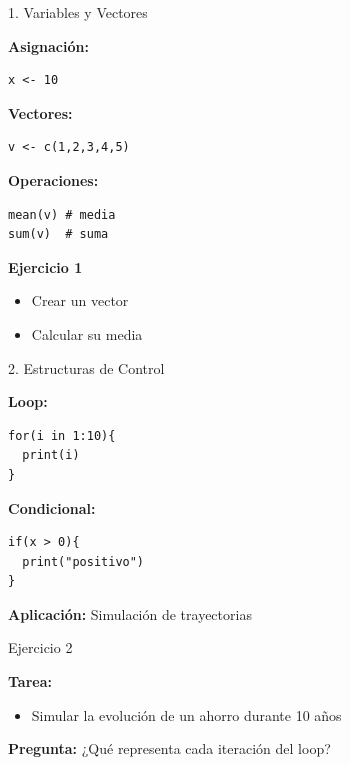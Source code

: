 \documentclass[10pt]{beamer}
\begin{document}
\begin{frame}[fragile]{1. Variables y Vectores}

\textbf{Asignación:}

\begin{verbatim}
x <- 10
\end{verbatim}

\vspace{0.3cm}

\textbf{Vectores:}

\begin{verbatim}
v <- c(1,2,3,4,5)
\end{verbatim}

\vspace{0.3cm}

\textbf{Operaciones:}

\begin{verbatim}
mean(v) # media
sum(v)  # suma
\end{verbatim}

\vspace{0.3cm}


\textbf{Ejercicio 1}
    \begin{itemize}
        \item Crear un vector 
        \item Calcular su media
    \end{itemize}
\end{frame}

\begin{frame}[fragile]{2. Estructuras de Control}

\textbf{Loop:}

\begin{verbatim}
for(i in 1:10){
  print(i)
}
\end{verbatim}

\vspace{0.3cm}

\textbf{Condicional:}

\begin{verbatim}
if(x > 0){
  print("positivo")
}
\end{verbatim}

\vspace{0.3cm}

\textbf{Aplicación:}
Simulación de trayectorias

\end{frame}

\begin{frame}{Ejercicio 2}

\textbf{Tarea:}

\begin{itemize}
\item Simular la evolución de un ahorro durante 10 años
\end{itemize}

\vspace{0.3cm}

\textbf{Pregunta:}
¿Qué representa cada iteración del loop?

\end{frame}
\end{document}
